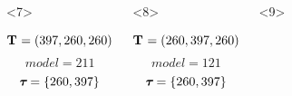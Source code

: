 \begin{frame}
\begin{columns}[c]
\begin{onlyenv}
\begin{minipage}[c][0.5\textheight][c]{\linewidth}
\begin{displaybox}[0.95\linewidth]
                \end{displaybox}
            \end{minipage}
        \end{onlyenv}
        \begin{onlyenv}<7>
            \begin{minipage}[c][0.5\textheight][c]{\linewidth}
                \begin{displaybox}[0.95\linewidth]
                    \begin{minipage}[c][0.45\textheight][c]{0.95\linewidth}
                        \[
                            \mathbf{T_{}} = (397,260,260)
                        \]\vspace{0mm}
                        \[
                            model = 211
                        \]\vspace{0mm}
                        \[
                            \boldsymbol{\tau_{}} = \{260,397\}
                        \]\vspace{0mm}
                    \end{minipage}
                \end{displaybox}
            \end{minipage}
        \end{onlyenv}
        \begin{onlyenv}<8>
            \begin{minipage}[c][0.5\textheight][c]{\linewidth}
                \begin{displaybox}[0.95\linewidth]
                    \begin{minipage}[c][0.45\textheight][c]{0.95\linewidth}
                        \[
                            \mathbf{T_{}} = (260,397,260)
                        \]\vspace{0mm}
                        \[
                            model = 121
                        \]\vspace{0mm}
                        \[
                            \boldsymbol{\tau_{}} = \{260,397\}
                        \]\vspace{0mm}
                    \end{minipage}
                \end{displaybox}
            \end{minipage}
        \end{onlyenv}
        \begin{onlyenv}<9>
            \begin{minipage}[c][0.5\textheight][c]{\linewidth}

\end{minipage}
\end{onlyenv}
\end{columns}
\end{frame}
